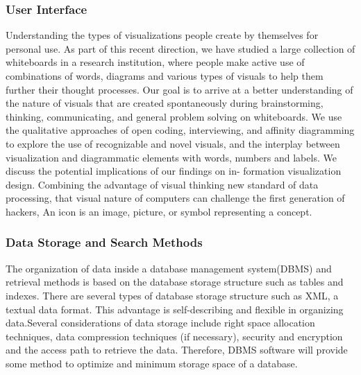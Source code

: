 	
\subsubsection*{User Interface}
Understanding the types of visualizations people create by themselves for personal use. As part of this recent direction, we have studied a large collection of whiteboards in a research institution, where people make active use of combinations of words, diagrams and various types of visuals to help them further their thought processes. Our goal is to arrive at a better understanding of the nature of visuals that are created spontaneously during brainstorming, thinking, communicating, and general problem solving on whiteboards.\cite{Blascheck2016} We use the qualitative approaches of open coding, interviewing, and affinity diagramming to explore the use of recognizable and novel visuals, and the interplay between visualization and diagrammatic elements with words, numbers and labels. We discuss the potential implications of our findings on in- formation visualization design. Combining the advantage of visual thinking new standard of data processing, that visual nature of computers can challenge the first generation of hackers, An icon is an image, picture, or symbol representing a concept.\cite{Szpunar2010}
	
	
\subsubsection*{Data Storage and Search Methods}
The organization of data inside a database management system(DBMS) and retrieval methods is based on the database storage structure such as tables and indexes. There are several types of database storage structure such as XML, a textual data format. This advantage is self-describing and flexible in organizing data.\cite{ISI:000253400700005}Several considerations of data storage include right space allocation techniques, data compression techniques (if necessary), security and encryption and the access path to retrieve the data. Therefore, DBMS software will provide some method to optimize and minimum storage space of a database.
	
